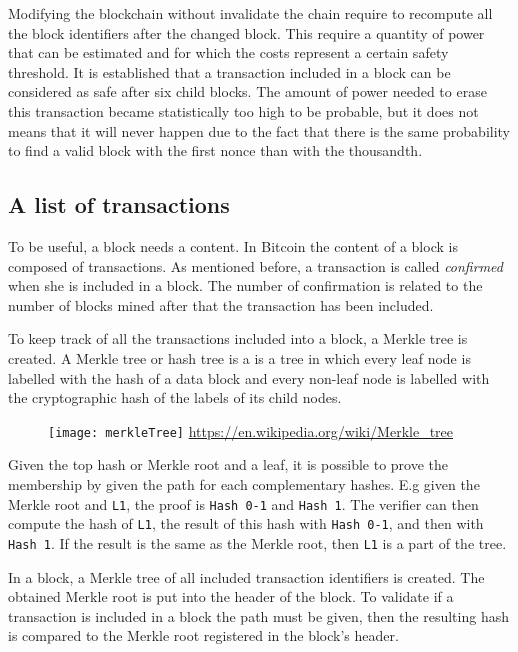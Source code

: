 Modifying the blockchain without invalidate the chain require to recompute all the
block identifiers after the changed block. This require a quantity of power that
can be estimated and for which the costs represent a certain safety threshold.
It is established that a transaction included in a block can be considered as safe
after six child blocks. The amount of power needed to erase this transaction became
statistically too high to be probable, but it does not means that it will never happen
due to the fact that there is the same probability to find a valid block with the
first nonce than with the thousandth.

\subsection{A list of transactions}

To be useful, a block needs a content. In Bitcoin the content of a block is composed
of transactions. As mentioned before, a transaction is called \textit{confirmed} when
she is included in a block. The number of confirmation is related to the number of
blocks mined after that the transaction has been included.

To keep track of all the transactions included into a block, a Merkle tree is created.
A Merkle tree or hash tree is a is a tree in which every leaf node is labelled with
the hash of a data block and every non-leaf node is labelled with the cryptographic
hash of the labels of its child nodes.

\begin{figure}[H]
	\centering
	\texttt{[image: merkleTree]}
	{\url{https://en.wikipedia.org/wiki/Merkle_tree}}
	\label{fig:merkleTree}
\end{figure}

Given the top hash or Merkle root and a leaf, it is possible to prove the membership
by given the path for each complementary hashes. E.g given the Merkle root and \texttt{L1},
the proof is \texttt{Hash 0-1} and \texttt{Hash 1}. The verifier can then compute
the hash of \texttt{L1}, the result of this hash with \texttt{Hash 0-1}, and then with
\texttt{Hash 1}. If the result is the same as the Merkle root, then \texttt{L1} is a part
of the tree.

In a block, a Merkle tree of all included transaction identifiers is created. The
obtained Merkle root is put into the header of the block. To validate if a transaction
is included in a block the path must be given, then the resulting hash is compared
to the Merkle root registered in the block's header.

